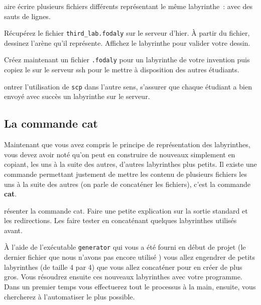 \documentclass[a4paper]{article}
\newenvironment{enseignants}[1]{\noindent\color{blue}{\bf #1}}{}
\begin{document}
\begin{enseignants}
  Faire écrire plusieurs fichiers différents représentant le même labyrinthe~: avec des sauts de lignes.
\end{enseignants}

Récupérez le fichier \verb|third_lab.fodaly| sur le serveur d'hier.
À partir du fichier, dessinez l'arène qu'il représente.
Affichez le labyrinthe pour valider votre dessin.

Créez maintenant un fichier \verb|.fodaly| pour un labyrinthe de votre invention puis copiez le sur le serveur ssh pour le mettre à disposition des autres étudiants.

\begin{enseignants}
  Montrer l'utilisation de \verb|scp| dans l'autre sens, s'assurer que chaque étudiant a bien envoyé avec succès un labyrinthe sur le serveur.
\end{enseignants}


\subsection{La commande cat}

Maintenant que vous avez compris le principe de représentation des labyrinthes, vous devez avoir noté qu'on peut en construire de nouveaux simplement en copiant, les uns à la suite des autres, d'autres labyrinthes plus petits. Il existe une commande permettant justement de mettre les contenu de plusieurs fichiers les uns à la suite des autres (on parle de concaténer les fichiers), c'est la commande \textbf{cat}.

\begin{enseignants}
  Présenter la commande cat.
  Faire une petite explication sur la sortie standard et les redirections.
  Les faire tester en concaténant quelques labyrinthes utilisés avant.
\end{enseignants}

À l'aide de l'exécutable \verb|generator| qui vous a été fourni en début de projet (le dernier fichier que nous n'avons pas encore utilisé ) vous allez engendrer de petits labyrinthes (de taille 4 par 4) que vous allez concaténer pour en créer de plus gros. Vous résoudrez ensuite ces nouveaux labyrinthes avec votre programme.
Dans un premier temps vous effectuerez tout le processus à la main,
ensuite, vous chercherez à l'automatiser le plus possible.
\end{document}
